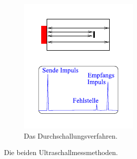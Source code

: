 \begin{figure}
\begin{subfigure}{0.49\columnwidth}
        \includegraphics[width=\textwidth]{pictures/Zeichnung2.pdf}
        \caption{Das Durchschallungsverfahren.}
        \label{fig:Zeichnung2}
    \end{subfigure}
    \caption{Die beiden Ultraschallmessmethoden. \cite{us1}}
    \label{fig:verfahren}
\end{figure}